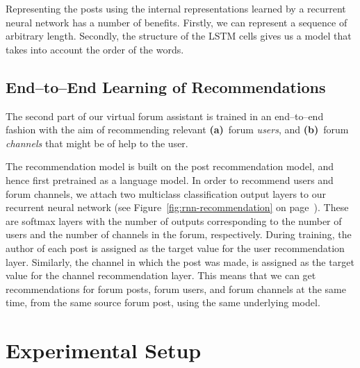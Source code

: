 \documentclass[11pt]{article}
\begin{document}
Representing the posts using the internal representations learned by a recurrent neural network has a number of benefits. Firstly, we can represent a sequence of arbitrary length. Secondly, the structure of the LSTM cells gives us a model that takes into account the order of the words.



\subsection{End--to--End Learning of Recommendations}

The second part of our virtual forum assistant is trained in an end--to--end fashion with the aim of recommending relevant \textbf{(a)}~forum \textit{users}, and \textbf{(b)}~forum \textit{channels} that might be of help to the user.

The recommendation model is built on the post recommendation model, and hence first pretrained as a language model.
In order to recommend users and forum channels, we attach two multiclass classification output layers to our recurrent neural network (see Figure~\ref{fig:rnn-recommendation} on page~\pageref{fig:rnn-recommendation}). These are softmax layers with the number of outputs corresponding to the number of users and the number of channels in the forum, respectively.
During training, the author of each post is assigned as the target value for the user recommendation layer. Similarly, the channel in which the post was made, is assigned as the target value for the channel recommendation layer.
This means that we can get recommendations for forum posts, forum users, and forum channels at the same time, from the same source forum post, using the same underlying model.

\section{Experimental Setup}
\end{document}
